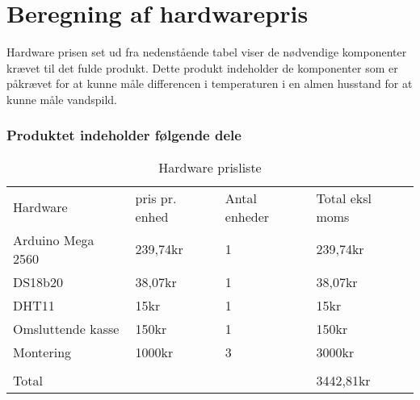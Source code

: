 \section{Beregning af hardwarepris}
Hardware prisen set ud fra nedenstående tabel viser de nødvendige komponenter krævet til det fulde produkt. Dette produkt indeholder de komponenter som er påkrævet for at kunne måle differencen i temperaturen i en almen husstand for at kunne måle vandspild.
\subsubsection{Produktet indeholder følgende dele}  


\begin{table}[h]
\centering
\begin{tabular}{ |p{3cm}||p{3cm}|p{3cm}|p{3cm}|  }
 \hline
 \rowcolor{lightgray}\multicolumn{4}{|c|}{Pris beregning} \\
 \hline
 Hardware    & pris pr. enhed &Antal enheder&Total eksl moms\\
 \hline
 Arduino Mega 2560   & 239,74kr    &1&   239,74kr\\
 \hline
 DS18b20&   38,07kr  & 1   &38,07kr\\
 \hline
 DHT11 &15kr & 1&  15kr\\
 \hline
  Omsluttende kasse\footnotemark  &150kr & 1&  150kr\\
 \hline
  Montering &1000kr & 3&  3000kr\\
 \hline
 		&	&	&\\
 \hline
 Total	&	&	&3442,81kr\\
 \hline 
\end{tabular}
\caption{Hardware prisliste}
\end{table}

